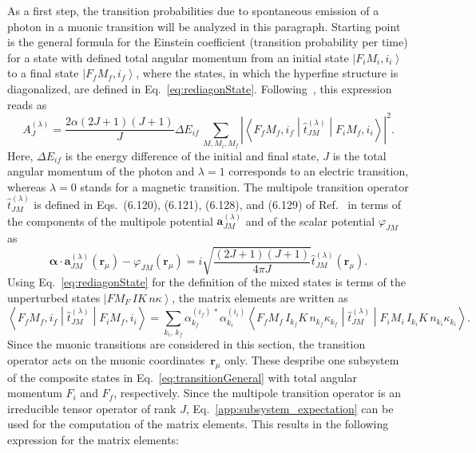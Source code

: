 As a first step, the transition probabilities due to spontaneous emission of a photon in a muonic transition will be analyzed in this paragraph. Starting point is the general formula for the Einstein coefficient (transition probability per time) for a state with defined total angular momentum from an initial state $\left|F_iM_i,i_i\right>$ to a final state $\left|F_fM_f,i_f\right>$, where the states, in which the hyperfine structure is diagonalized, are defined in Eq.~\eqref{eq:rediagonState}. Following~\cite[Section 6.]{johnson2007}, this expression reads as
\begin{equation}
\label{eq:transitionGeneral}
A^{(\lambda)}_{J}=\frac{2\alpha (2J+1)(J+1)}{J}\Delta E_{if}\,\sum_{M,M_i,M_f} \left|\left<F_fM_f,i_f\middle|\hat{t}^{(\lambda)}_{JM}\middle|F_iM_f,i_i\right>\right|^2.
\end{equation}
Here, $\Delta E_{if}$ is the energy difference of the initial and final state, $J$ is the total angular momentum of the photon and $\lambda=1$ corresponds to an electric transition, whereas $\lambda=0$ stands for a magnetic transition. The multipole transition operator $\hat{t}^{(\lambda)}_{JM}$ is defined in Eqs.~(6.120), (6.121), (6.128), and (6.129) of Ref.~\cite{johnson2007} in terms of the components of the multipole potential $\mathbf{a}^{(\lambda)}_{JM}$ and of the scalar potential $\varphi_{JM}$ as
\begin{equation}
\boldsymbol{\alpha}\cdot \mathbf{a}^{(\lambda)}_{JM}(\mathbf{r}_\mu) - \varphi_{JM}(\mathbf{r}_\mu) = i\sqrt{\frac{(2J+1)(J+1)}{4\pi J}}\hat{t}^{(\lambda)}_{JM}(\mathbf{r}_\mu).
\end{equation}
Using Eq.~\eqref{eq:rediagonState} for the definition of the mixed states is terms of the unperturbed states $\left| FM_F\,IK\,n\kappa\right>$, the matrix elements are written as
\begin{equation}
\label{eq:tranElement1}
\left<F_fM_f,i_f\middle|\hat{t}^{(\lambda)}_{JM}\middle|F_iM_f,i_i\right> =
\sum_{k_i,\,k_f}\alpha^{(i_f)\,*}_{k_f} \alpha^{(i_i)}_{k_i}\left<F_fM_f\,I_{k_f}K\,n_{k_f}\kappa_{k_f} \middle|\hat{t}^{(\lambda)}_{JM}\middle|F_iM_i\,I_{k_i}K\,n_{k_i}\kappa_{k_i}\right>.
\end{equation}
Since the muonic transitions are considered in this section, the transition operator acts on the muonic coordinates~$\mathbf{r}_\mu$ only. These despribe one subsystem of the composite states in Eq.~\eqref{eq:transitionGeneral} with total angular momentum $F_i$ and $F_f$, respectively. Since the multipole transition operator is an irreducible tensor operator of rank $J$, Eq.~\eqref{app:subsystem_expectation} can be used for the computation of the matrix elements. This results in the following expression for the matrix elements:
